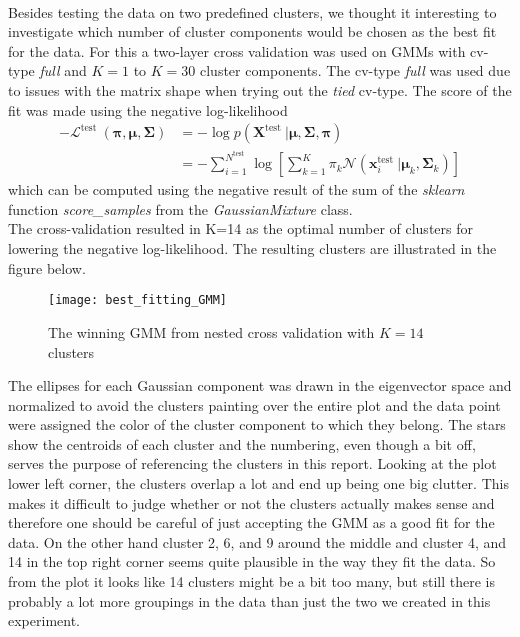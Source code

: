\\
Besides testing the data on two predefined clusters, we thought it interesting to investigate which number of cluster components would be chosen as the best fit for the data. For this a two-layer cross validation was used on GMMs with cv-type \textit{full} and $ K=1 $ to $ K=30 $ cluster components. The cv-type \textit{full} was used due to issues with the matrix shape when trying out the \textit{tied} cv-type.
The score of the fit was made using the negative log-likelihood
\begin{equation}
\begin{aligned} -\mathcal{L}^{\text {test }}(\boldsymbol{\pi}, \boldsymbol{\mu}, \boldsymbol{\Sigma}) &= -\log p\left(\boldsymbol{X}^{\text {test }} | \boldsymbol{\mu}, \boldsymbol{\Sigma}, \boldsymbol{\pi}\right) \\ &= -\sum_{i=1}^{N^{\text {test }}} \log \left[\sum_{k=1}^{K} \pi_{k} \mathcal{N}\left(\boldsymbol{x}_{i}^{\text {test }} | \boldsymbol{\mu}_{k}, \boldsymbol{\Sigma}_{k}\right)\right] \end{aligned}
\end{equation}
which can be computed using the negative result of the sum of the \textit{sklearn} function \textit{score\_samples} from the \textit{GaussianMixture} class.
\\
The cross-validation resulted in K=14 as the optimal number of clusters for lowering the negative log-likelihood. The resulting clusters are illustrated in the figure below.
\begin{figure}[H]
	\centering
	\texttt{[image: best\_fitting\_GMM]}
	\caption{The winning GMM from nested cross validation with $ K=14 $ clusters}\label{fig:PCA}
\end{figure}\noindent
The ellipses for each Gaussian component was drawn in the eigenvector space and normalized to avoid the clusters painting over the entire plot and the data point were assigned the color of the cluster component to which they belong. The stars show the centroids of each cluster and the numbering, even though a bit off, serves the purpose of referencing the clusters in this report. Looking at the plot lower left corner, the clusters overlap a lot and end up being one big clutter. This makes it difficult to judge whether or not the clusters actually makes sense and therefore one should be careful of just accepting the GMM as a good fit for the data. On the other hand cluster 2, 6, and 9 around the middle and cluster 4, and 14 in the top right corner seems quite plausible in the way they fit the data. So from the plot it looks like 14 clusters might be a bit too many, but still there is probably a lot more groupings in the data than just the two we created in this experiment.

